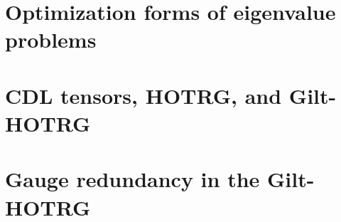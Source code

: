 \documentclass[aps,prb,reprint,superscriptaddress]{revtex4-2}
\begin{document}
\appendix
\section{Optimization forms of eigenvalue problems\label{appd:opteig}}

\section{CDL tensors, HOTRG, and Gilt-HOTRG\label{appd:cdlHOTRG}}

\section{Gauge redundancy in the Gilt-HOTRG\label{appd:gaugeFix}}



\end{document}
